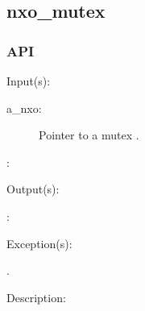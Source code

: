 %
%
%
%
%              

\subsection{nxo\_mutex}
\label{nxo_mutex}

\subsubsection{API}
\begin{capi}
\label{nxo_mutex_}
	\begin{capilist}
	\item[Input(s): ]
		\begin{description}\item[]
		\item[a\_nxo: ]
			Pointer to a mutex .
		\item[: ]
		\end{description}
	\item[Output(s): ]
		\begin{description}\item[]
		\item[: ]
		\end{description}
	\item[Exception(s): ]
		\begin{description}\item[]
		\item[.]
		\end{description}
	\item[Description: ]
	\end{capilist}
\end{capi}
